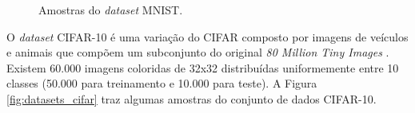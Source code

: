 \begin{figure}[H]
    \hspace{0.1cm}
    \hspace{0.1cm}
    \caption{Amostras do \textit{dataset} MNIST.}
    \label{fig:datasets_mnist}
\end{figure}


O \textit{dataset} CIFAR-10 é uma variação do CIFAR composto por imagens de veículos e animais que compõem um subconjunto do original \textit{80 Million Tiny Images} \citep{4531741}. Existem 60.000 imagens coloridas de 32x32 distribuídas uniformemente entre 10 classes (50.000 para treinamento e 10.000 para teste). A Figura \ref{fig:datasets_cifar} traz algumas amostras do conjunto de dados CIFAR-10.


